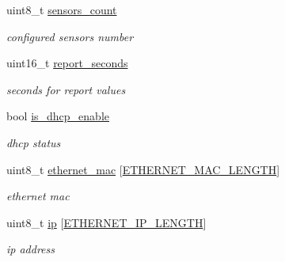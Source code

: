 \begin{DoxyCompactItemize}
\mbox{\label{structconfiguration__t_a9a1e7c702c2dd7270f31aca29264db86}} 
uint8\+\_\+t \hyperlink{structconfiguration__t_a9a1e7c702c2dd7270f31aca29264db86}{sensors\+\_\+count}
\begin{DoxyCompactList}\small\item\em configured sensors number \end{DoxyCompactList}\item 
\mbox{\label{structconfiguration__t_a0c0dc512cf86464d2e8dad486e042c5c}} 
uint16\+\_\+t \hyperlink{structconfiguration__t_a0c0dc512cf86464d2e8dad486e042c5c}{report\+\_\+seconds}
\begin{DoxyCompactList}\small\item\em seconds for report values \end{DoxyCompactList}\item 
\mbox{\label{structconfiguration__t_a04554256dd43582433092cd70dd8b87d}} 
bool \hyperlink{structconfiguration__t_a04554256dd43582433092cd70dd8b87d}{is\+\_\+dhcp\+\_\+enable}
\begin{DoxyCompactList}\small\item\em dhcp status \end{DoxyCompactList}\item 
\mbox{\label{structconfiguration__t_a6ade77826c87e62532cae8ca0f045dac}} 
uint8\+\_\+t \hyperlink{structconfiguration__t_a6ade77826c87e62532cae8ca0f045dac}{ethernet\+\_\+mac} \mbox{[}\hyperlink{ethernet__config_8h_aafad911924144dbfc03b66b146ed4439}{E\+T\+H\+E\+R\+N\+E\+T\+\_\+\+M\+A\+C\+\_\+\+L\+E\+N\+G\+TH}\mbox{]}
\begin{DoxyCompactList}\small\item\em ethernet mac \end{DoxyCompactList}\item 
\mbox{\label{structconfiguration__t_a0b698acfbb52f889c906b9b175f7a5d5}} 
uint8\+\_\+t \hyperlink{structconfiguration__t_a0b698acfbb52f889c906b9b175f7a5d5}{ip} \mbox{[}\hyperlink{ethernet__config_8h_ae8de53528e88d8ff4516d82a48590bd7}{E\+T\+H\+E\+R\+N\+E\+T\+\_\+\+I\+P\+\_\+\+L\+E\+N\+G\+TH}\mbox{]}
\begin{DoxyCompactList}\small\item\em ip address \end{DoxyCompactList}\item 

\end{DoxyCompactItemize}
